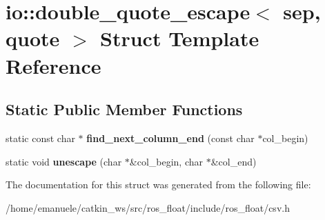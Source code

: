 \hypertarget{structio_1_1double__quote__escape}{}\section{io\+:\+:double\+\_\+quote\+\_\+escape$<$ sep, quote $>$ Struct Template Reference}
\label{structio_1_1double__quote__escape}
\subsection*{Static Public Member Functions}
\begin{DoxyCompactItemize}
\item 
\mbox{\label{structio_1_1double__quote__escape_a30070914039ca8a20f716fbf53d68c41}} 
static const char $\ast$ {\bfseries find\+\_\+next\+\_\+column\+\_\+end} (const char $\ast$col\+\_\+begin)
\item 
\mbox{\label{structio_1_1double__quote__escape_a02e332751916fbdb7b35c238d690e580}} 
static void {\bfseries unescape} (char $\ast$\&col\+\_\+begin, char $\ast$\&col\+\_\+end)
\end{DoxyCompactItemize}


The documentation for this struct was generated from the following file\+:\begin{DoxyCompactItemize}
\item 
/home/emanuele/catkin\+\_\+ws/src/ros\+\_\+float/include/ros\+\_\+float/csv.\+h\end{DoxyCompactItemize}
